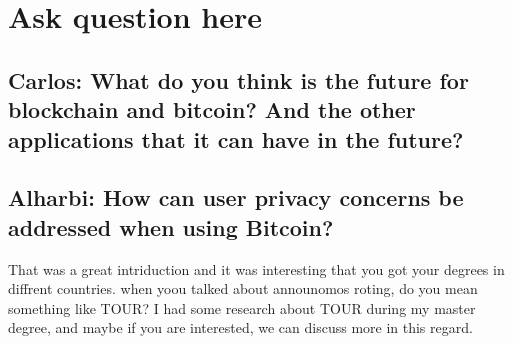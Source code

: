 \section{Ask question here}

\subsection{Carlos: What do you think is the future for blockchain and bitcoin? And the other applications that it can have in the future?}

\subsection{Alharbi: How can user privacy concerns be addressed when using Bitcoin?}
That was a great intriduction and it was interesting that you got your degrees in diffrent countries. when yoou talked about announomos roting, do you mean something like TOUR? I had some research about TOUR during my master degree, and maybe if you are interested, we can discuss more in this regard. 
